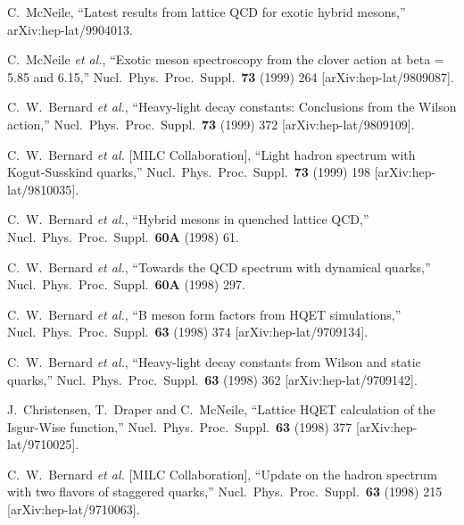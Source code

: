 \begin{thebibliography}{130}
C.~McNeile,
``Latest results from lattice QCD for exotic hybrid mesons,''
arXiv:hep-lat/9904013.



C.~McNeile {\it et al.},
``Exotic meson spectroscopy from the clover action at beta = 5.85 and  6.15,''
Nucl.\ Phys.\ Proc.\ Suppl.\  {\bf 73} (1999) 264
[arXiv:hep-lat/9809087].

C.~W.~Bernard {\it et al.},
``Heavy-light decay constants: Conclusions from the Wilson action,''
Nucl.\ Phys.\ Proc.\ Suppl.\  {\bf 73} (1999) 372
[arXiv:hep-lat/9809109].

C.~W.~Bernard {\it et al.}  [MILC Collaboration],
``Light hadron spectrum with Kogut-Susskind quarks,''
Nucl.\ Phys.\ Proc.\ Suppl.\  {\bf 73} (1999) 198
[arXiv:hep-lat/9810035].



C.~W.~Bernard {\it et al.},
``Hybrid mesons in quenched lattice QCD,''
Nucl.\ Phys.\ Proc.\ Suppl.\  {\bf 60A} (1998) 61.

C.~W.~Bernard {\it et al.},
``Towards the QCD spectrum with dynamical quarks,''
Nucl.\ Phys.\ Proc.\ Suppl.\  {\bf 60A} (1998) 297.


C.~W.~Bernard {\it et al.},
``B meson form factors from HQET simulations,''
Nucl.\ Phys.\ Proc.\ Suppl.\  {\bf 63} (1998) 374
[arXiv:hep-lat/9709134].

C.~W.~Bernard {\it et al.},
``Heavy-light decay constants from Wilson and static quarks,''
Nucl.\ Phys.\ Proc.\ Suppl.\  {\bf 63} (1998) 362
[arXiv:hep-lat/9709142].

J.~Christensen, T.~Draper and C.~McNeile,
``Lattice HQET calculation of the Isgur-Wise function,''
Nucl.\ Phys.\ Proc.\ Suppl.\  {\bf 63} (1998) 377
[arXiv:hep-lat/9710025].

C.~W.~Bernard {\it et al.}  [MILC Collaboration],
``Update on the hadron spectrum with two flavors of staggered quarks,''
Nucl.\ Phys.\ Proc.\ Suppl.\  {\bf 63} (1998) 215
[arXiv:hep-lat/9710063].


\end{thebibliography}
